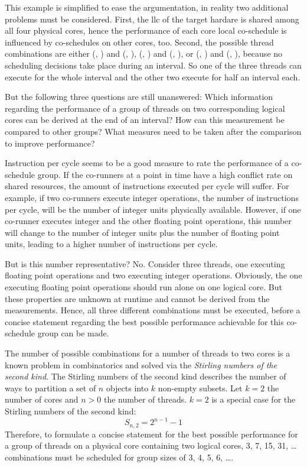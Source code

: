 This example is simplified to ease the argumentation, in reality two additional
problems must be considered.
First, the \gls{llc} of the target hardare is shared among all four physical cores,
hence the performance of each core local co-schedule is influenced by
co-schedules on other cores, too.
Second, the possible thread combinations are either (\alpha, \beta) and
(\gamma, \beta), (\alpha, \beta) and (\alpha, \gamma), or (\alpha, \gamma) and
(\beta, \gamma), because no scheduling decisions take place during an interval.
So one of the three threads can execute for the whole interval and the other
two execute for half an interval each.

But the following three questions are still unanswered:
Which information regarding the performance of a group of threads on two
corresponding logical cores can be derived at the end of an interval?
How can this measurement be compared to other groups?
What measures need to be taken after the comparison to improve performance?

Instruction per cycle seems to be a good measure to rate the performance of a
co-schedule group.
If the co-runners at a point in time have a high conflict
rate on shared resources, the amount of instructions executed per cycle will
suffer.
For example, if two co-runners execute integer operations, the number of
instructions per cycle, will be the number of integer units physically available.
However, if one co-runner executes integer and the other floating point
operations, this number will change to the number of integer units plus
the number of floating point units, leading to a higher number of instructions
per cycle.

But is this number representative? No. Consider three threads, one executing
floating point operations and two executing integer operations. Obviously, the
one executing floating point operations should run alone on one logical core.
But these properties are
unknown at runtime and cannot be derived from the measurements.
Hence, all three different combinations must be executed, before a concise
statement regarding the best possible performance achievable for this 
co-schedule group can be made.

The number of possible combinations for a number of threads to two cores is
a known problem in combinatorics and solved via the
\emph{Stirling numbers of the second kind}.
The Stirling numbers of the second kind describes the number of ways to
partition a set of $n$ objects into $k$ non-empty subsets.
Let $k=2$ the number of cores and $n>0$ the number of threads.
$k=2$ is a special case for the Stirling numbers of the second kind:
%
$$S_{n,2} = 2^{n-1}-1$$
%
Therefore, to formulate a concise statement for the best possible performance
for a group of threads on a physical core containing two logical cores,
3, 7, 15, 31, \ldots{} combinations must be scheduled for group sizes of
3, 4, 5, 6, \ldots.

